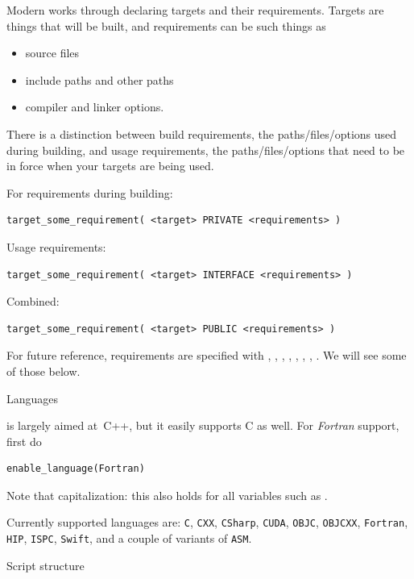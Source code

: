 Modern  works through declaring targets and their requirements.
Targets are things that will be built, and requirements can be such things as
\begin{itemize}
\item source files
\item include paths and other paths
\item compiler and linker options.
\end{itemize}
There is a distinction between build requirements,
the paths/files/options used during building,
and usage requirements,
the paths/files/options that need to be in force
when your targets are being used.

For requirements during building:
\begin{lstlisting}
target_some_requirement( <target> PRIVATE <requirements> )
\end{lstlisting}
Usage requirements:
\begin{lstlisting}
target_some_requirement( <target> INTERFACE <requirements> )
\end{lstlisting}
Combined:
\begin{lstlisting}
target_some_requirement( <target> PUBLIC <requirements> )
\end{lstlisting}
\begingroup \raggedright
For future reference, requirements are specified with
,
,
,
,
,
,
,
.
We will see some of those below.
\endgroup

 {Languages}

 is largely aimed at~C++, but it easily supports C as well.
For \emph{Fortran} support,
first do
\begin{lstlisting}
enable_language(Fortran)
\end{lstlisting}
Note that capitalization: this also holds for all variables
such as .

Currently supported languages are:
\lstinline{C}, \lstinline{CXX}, \lstinline{CSharp}, \lstinline{CUDA}, \lstinline{OBJC},
\lstinline{OBJCXX}, \lstinline{Fortran}, \lstinline{HIP}, \lstinline{ISPC}, \lstinline{Swift},
and a couple of variants of \lstinline{ASM}.

 {Script structure}

